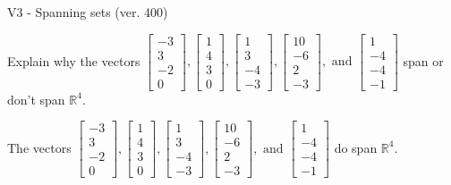 \begin{exercise}
  \begin{exerciseTitle}V3 - Spanning sets (ver. 400)\end{exerciseTitle}
  \begin{exerciseStatement}
    Explain why the vectors \(\left[\begin{array}{r}
-3 \\
3 \\
-2 \\
0
\end{array}\right] , \left[\begin{array}{r}
1 \\
4 \\
3 \\
0
\end{array}\right] , \left[\begin{array}{r}
1 \\
3 \\
-4 \\
-3
\end{array}\right] , \left[\begin{array}{r}
10 \\
-6 \\
2 \\
-3
\end{array}\right] , \text{ and } \left[\begin{array}{r}
1 \\
-4 \\
-4 \\
-1
\end{array}\right]\) span or don't span \(\mathbb{R}^4\). 
	


  \end{exerciseStatement}
  \begin{exerciseAnswer}
   The vectors \(\left[\begin{array}{r}
-3 \\
3 \\
-2 \\
0
\end{array}\right] , \left[\begin{array}{r}
1 \\
4 \\
3 \\
0
\end{array}\right] , \left[\begin{array}{r}
1 \\
3 \\
-4 \\
-3
\end{array}\right] , \left[\begin{array}{r}
10 \\
-6 \\
2 \\
-3
\end{array}\right] , \text{ and } \left[\begin{array}{r}
1 \\
-4 \\
-4 \\
-1
\end{array}\right]\) 
  	 do  
	span \(\mathbb{R}^4\).
  



\end{exerciseAnswer}
\end{exercise}
